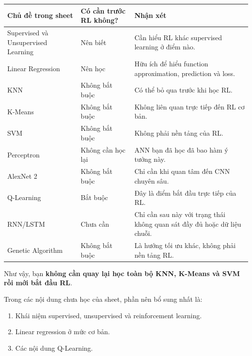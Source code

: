 \documentclass[12pt,a4paper]{article}
\begin{document}
\begin{table}[htbp]
\centering
\small
\begin{tabularx}{\textwidth}{
    >{\raggedright\arraybackslash}p{4.1cm}
    >{\centering\arraybackslash}p{3.0cm}
    >{\raggedright\arraybackslash}X
}
\toprule
\textbf{Chủ đề trong sheet} &
\textbf{Có cần trước RL không?} &
\textbf{Nhận xét} \\
\midrule
Supervised và Unsupervised Learning &
Nên biết &
Cần hiểu RL khác supervised learning ở điểm nào. \\

Linear Regression &
Nên học &
Hữu ích để hiểu function approximation, prediction và loss. \\

KNN &
Không bắt buộc &
Có thể bỏ qua trước khi học RL. \\

K-Means &
Không bắt buộc &
Không liên quan trực tiếp đến RL cơ bản. \\

SVM &
Không bắt buộc &
Không phải nền tảng của RL. \\

Perceptron &
Không cần học lại &
ANN bạn đã học đã bao hàm ý tưởng này. \\

AlexNet 2 &
Không bắt buộc &
Chỉ cần khi quan tâm đến CNN chuyên sâu. \\

Q-Learning &
Bắt buộc &
Đây là điểm bắt đầu trực tiếp của RL. \\

RNN/LSTM &
Chưa cần &
Chỉ cần sau này với trạng thái không quan sát đầy đủ hoặc dữ liệu chuỗi. \\

Genetic Algorithm &
Không bắt buộc &
Là hướng tối ưu khác, không phải nền tảng RL. \\
\bottomrule
\end{tabularx}
\end{table}

Như vậy, bạn \textbf{không cần quay lại học toàn bộ KNN, K-Means và SVM rồi mới bắt đầu RL}.

Trong các nội dung chưa học của sheet, phần nên bổ sung nhất là:

\begin{enumerate}[leftmargin=1.8em]
    \item Khái niệm supervised, unsupervised và reinforcement learning.
    \item Linear regression ở mức cơ bản.
    \item Các nội dung Q-Learning.
\end{enumerate}
\end{document}
